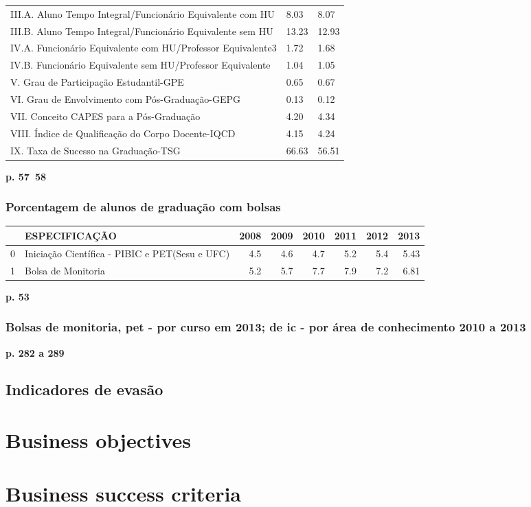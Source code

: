 \documentclass{article}
\begin{document}
\begin{tabular}{lll}
III.A. Aluno Tempo Integral/Funcionário Equivalente com HU  &  8.03 &  8.07 \\
III.B. Aluno Tempo Integral/Funcionário Equivalente sem HU  &  13.23 &  12.93 \\
IV.A. Funcionário Equivalente com HU/Professor Equivalente3 &  1.72 &  1.68 \\
IV.B. Funcionário Equivalente sem HU/Professor Equivalente  &  1.04 &  1.05 \\
V. Grau de Participação Estudantil-GPE                      &  0.65 &  0.67 \\
VI. Grau de Envolvimento com Pós-Graduação-GEPG             &  0.13 &  0.12 \\
VII. Conceito CAPES para a Pós-Graduação                    &  4.20 &  4.34 \\
VIII. Índice de Qualificação do Corpo Docente-IQCD          &  4.15 &  4.24 \\
IX. Taxa de Sucesso na Graduação-TSG                        &  66.63 &  56.51 \\
\bottomrule
\end{tabular}
\textbf{p. 57~58}

\subsubsection{Porcentagem de alunos de graduação com bolsas}
\begin{tabular}{llrrrrrr}
\toprule
{} &                                   ESPECIFICAÇÃO &  2008 &  2009 &  2010 &  2011 &  2012 &  2013 \\
\midrule
0 &  Iniciação Científica - PIBIC e PET(Sesu e UFC) &   4.5 &   4.6 &   4.7 &   5.2 &   5.4 &  5.43 \\
1 &                              Bolsa de Monitoria &   5.2 &   5.7 &   7.7 &   7.9 &   7.2 &  6.81 \\
\bottomrule
\end{tabular}

\textbf{p. 53}

\subsubsection{Bolsas de monitoria, pet - por curso em 2013; de ic - por área de conhecimento 2010 a 2013}
\textbf{p. 282 a 289}

\subsection{Indicadores de evasão}
\cite{esclarecimentos_calculos}
\cite{mudanca_calculos}

\section{Business objectives}

\section{Business success criteria}

\cite{anuario_2014_base_2013}
\cite{pdi_ufc}



\end{document}
